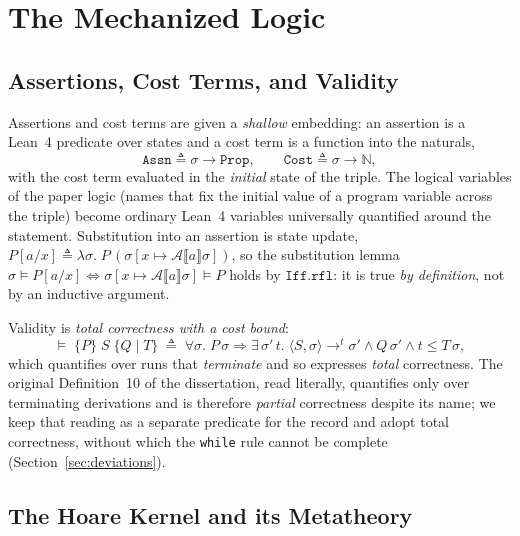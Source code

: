 \documentclass[runningheads]{llncs}
\newcommand{\Lean}{Lean~4\xspace}
\newcommand{\State}{\sigma}
\newcommand{\Nat}{\mathbb{N}}
\newcommand{\aval}[1]{\mathcal{A}\llbracket #1 \rrbracket}
\newcommand{\evals}[4]{\langle #1, #2\rangle \rightarrow^{#3} #4}
\newcommand{\triple}[4]{\{#1\}\;#2\;\{#3 \mid #4\}}
\newcommand{\subst}[3]{#1[#2/#3]}
\newcommand{\upd}[3]{#1[#2 \mapsto #3]}
\newcommand{\Valid}{\vDash}
\newcommand{\code}[1]{\texttt{#1}}
\begin{document}
\section{The Mechanized Logic}\label{sec:logic}

\subsection{Assertions, Cost Terms, and Validity}

Assertions and cost terms are given a \emph{shallow} embedding: an
assertion is a
\Lean{} predicate over states and a cost term is a function into the naturals,
\[
\code{Assn} \triangleq \State \to \code{Prop},
\qquad
\code{Cost} \triangleq \State \to \Nat,
\]
with the cost term evaluated in the \emph{initial} state of the triple.
The logical variables of the paper logic (names that fix the initial value of
a program variable across the triple) become ordinary \Lean{} variables
universally quantified around the statement.
Substitution into an assertion is state update,
$\subst{P}{a}{x} \triangleq
\lambda\State.\;P\,(\upd{\State}{x}{\aval{a}\State})$,
so the substitution lemma $\State \vDash \subst{P}{a}{x}
\Leftrightarrow \upd{\State}{x}{\aval{a}\State} \vDash P$ holds by
$\code{Iff.rfl}$: it is true \emph{by definition}, not by an inductive argument.

Validity is \emph{total correctness with a cost bound}:
\[
\Valid\;\triple{P}{S}{Q}{T} \;\triangleq\;
\forall\State.\; P\,\State \Rightarrow
\exists\,\State'\,t.\; \evals{S}{\State}{t}{\State'} \wedge Q\,\State'
\wedge t \le T\,\State,
\]
which quantifies over runs that \emph{terminate} and so expresses \emph{total}
correctness.
The original Definition~10 of the dissertation, read literally, quantifies only
over terminating derivations and is therefore \emph{partial} correctness despite
its name; we keep that reading as a separate predicate for the record and adopt
total correctness, without which the \code{while} rule cannot be complete
(Section~\ref{sec:deviations}).

\subsection{The Hoare Kernel and its Metatheory}
\end{document}
